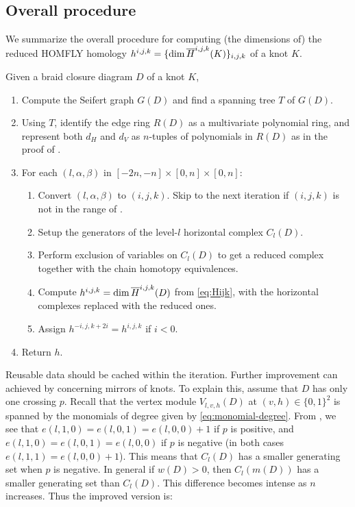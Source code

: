 \subsection{Overall procedure}

We summarize the overall procedure for computing (the dimensions of) the reduced HOMFLY homology $h^{i, j, k} = \{\dim \overline{H}^{i, j, k}(K)\}_{i, j, k}$ of a knot $K$.

\begin{algorithm}\label{algo:basic}
    Given a braid closure diagram $D$ of a knot $K$, 
    \begin{enumerate}
        \item Compute the Seifert graph $G(D)$ and find a spanning tree $T$ of $G(D)$. 
        
        \item Using $T$, identify the edge ring $R(D)$ as a multivariate polynomial ring, and represent both $d_H$ and $d_V$ as $n$-tuples of polynomials in $R(D)$ as in the proof of .
        
        \item For each $(l, \alpha, \beta)$ in $[-2n, -n] \times [0, n] \times [0, n]$:
        \begin{enumerate}
            \item Convert $(l, \alpha, \beta)$ to $(i, j, k)$. Skip to the next iteration if $(i, j, k)$ is not in the range of .
            
            \item Setup the generators of the level-$l$ horizontal complex $C_l(D)$.
            
            \item Perform exclusion of variables on $C_l(D)$ to get a reduced complex together with the chain homotopy equivalences. 

            \item Compute $h^{i, j, k} = \dim \overline{H}^{i, j, k}(D)$ from \eqref{eq:Hijk}, with the horizontal complexes replaced with the reduced ones. 
            
            \item Assign $h^{-i, j, k + 2i} = h^{i, j, k}$ if $i < 0$.
        \end{enumerate}
        \item Return $h$.
    \end{enumerate}
\end{algorithm}

Reusable data should be cached within the iteration. Further improvement can achieved by concerning mirrors of knots. To explain this, assume that $D$ has only one crossing $p$. Recall that the vertex module $V_{l, v, h}(D)$ at $(v, h) \in \{0, 1\}^2$ is spanned by the monomials of degree given  by \eqref{eq:monomial-degree}. From , we see that $e(l, 1, 0) = e(l, 0, 1) = e(l, 0, 0) + 1$ if $p$ is positive, and $e(l, 1, 0) = e(l, 0, 1) = e(l, 0, 0)$ if $p$ is negative (in both cases $e(l, 1, 1) = e(l, 0, 0) + 1$). This means that $C_l(D)$ has a smaller generating set when $p$ is negative. In general if $w(D) > 0$, then $C_l(m(D))$ has a smaller generating set than $C_l(D)$. This difference becomes intense as $n$ increases. Thus the improved version is:

